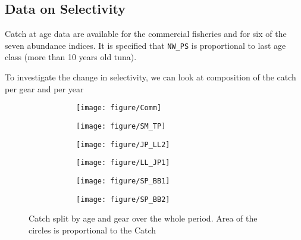 \subsection{Data on Selectivity}
Catch at age  data are available for the commercial  fisheries and for
six of the seven abundance  indices. It is specified that \verb+NW_PS+
is proportional to last age class (more than 10 years old tuna).






To investigate the  change in selectivity, we can  look at composition
of the catch per gear and per year
  \begin{figure}[bt]
  \begin{subfigure}[b]{0.9\textwidth}
  \begin{subfigure}[b]{0.45\textwidth}
   \texttt{[image: figure/Comm]} 
  \end{subfigure} \hfill
  \begin{subfigure}[b]{0.45\textwidth}
   \texttt{[image: figure/SM\_TP]} 
  \end{subfigure} 
  \end{subfigure} 
  
  \begin{subfigure}[b]{0.9\textwidth}
  \begin{subfigure}[b]{0.45\textwidth}
   \texttt{[image: figure/JP\_LL2]} 
  \end{subfigure} \hfill
  \begin{subfigure}[b]{0.45\textwidth}
   \texttt{[image: figure/LL\_JP1]} 
  \end{subfigure} 
  \end{subfigure} 
  
  \begin{subfigure}[b]{0.9\textwidth}
  \begin{subfigure}[b]{0.45\textwidth}
   \texttt{[image: figure/SP\_BB1]} 
  \end{subfigure} \hfill
  \begin{subfigure}[b]{0.45\textwidth}
   \texttt{[image: figure/SP\_BB2]} 
  \end{subfigure} 
  \end{subfigure} 
  \caption{Catch split by age and gear over the whole period. Area of the
	circles is proportional to the Catch}
  \end{figure}

